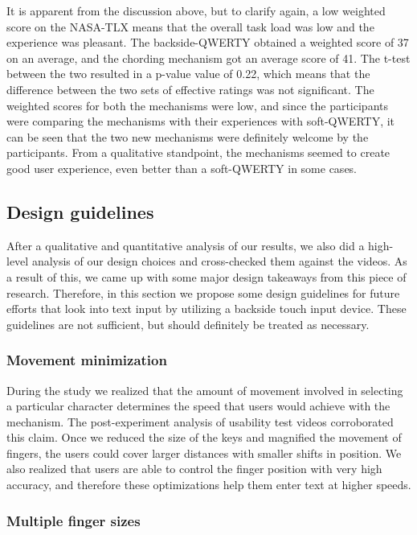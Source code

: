 It is apparent from the discussion above, but to clarify again, a low
weighted score on the NASA-TLX means that the overall task load was
low and the experience was pleasant. The backside-QWERTY obtained a
weighted score of 37 on an average, and the chording mechanism got an
average score of 41. The t-test between the two resulted in a p-value
value of 0.22, which means that the difference between the two sets of
effective ratings was not significant. The weighted scores for both
the mechanisms were low, and since the participants were comparing the
mechanisms with their experiences with soft-QWERTY, it can be seen
that the two new mechanisms were definitely welcome by the
participants. From a qualitative standpoint, the mechanisms seemed to
create good user experience, even better than a soft-QWERTY in some
cases.

\subsection{Design guidelines}

After a qualitative and quantitative analysis of our results, we also
did a high-level analysis of our design choices and cross-checked them
against the videos. As a result of this, we came up with some major
design takeaways from this piece of research. Therefore, in this
section we propose some design guidelines for future efforts that look
into text input by utilizing a backside touch input device. These
guidelines are not sufficient, but should definitely be treated as
necessary.

\subsubsection{Movement minimization}

During the study we realized that the amount of movement involved in
selecting a particular character determines the speed that users would
achieve with the mechanism. The post-experiment analysis of usability
test videos corroborated this claim. Once we reduced the size of the
keys and magnified the movement of fingers, the users could cover
larger distances with smaller shifts in position. We also realized
that users are able to control the finger position with very high
accuracy, and therefore these optimizations help them enter text at
higher speeds.

\subsubsection{Multiple finger sizes}


